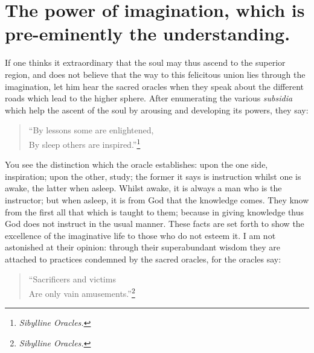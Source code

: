 \documentclass[12pt]{article}
\begin{document}
\section{The power of imagination, which is pre-eminently the understanding.}

If one thinks it extraordinary that the soul may thus ascend to the superior
region, and does not believe that the way to this felicitous union lies through
the imagination, let him hear the sacred oracles when they speak about the
different roads which lead to the higher sphere. After enumerating the various
\textit{subsidia} which help the ascent of the soul by arousing and developing
its powers, they say:

\begin{verse}
``By lessons some are enlightened,\\
By sleep others are inspired.''\footnote{\textit{Sibylline Oracles.}}
\end{verse}

\noindent You see the distinction which the oracle establishes: upon the one
side, inspiration; upon the other, study; the former it says is instruction
whilst one is awake, the latter when asleep. Whilst awake, it is always a man
who is the instructor; but when asleep, it is from God that the knowledge
comes. They know from the first all that which is taught to them; because in
giving knowledge thus God does not instruct in the usual manner. These facts
are set forth to show the excellence of the imaginative life to those who do
not esteem it. I am not astonished at their opinion: through their
superabundant wisdom they are attached to practices condemned by the sacred
oracles, for the oracles say:

\begin{verse}
``Sacrificers and victims\\
Are only vain amusements.''\footnote{\textit{Sibylline Oracles.}}
\end{verse}
\end{document}

